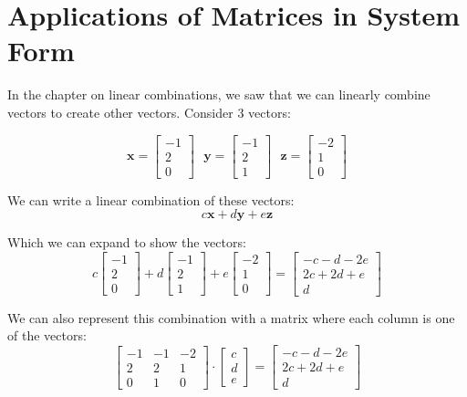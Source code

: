\chapter{Applications of Matrices in System Form}

In the chapter on linear combinations, we saw that we can linearly combine vectors to create other vectors. Consider 3 vectors:

$$\textbf{x} = \begin{bmatrix}
-1\\
2\\
0
\end{bmatrix}\text{ 	} \textbf{y} = \begin{bmatrix}
-1\\
2\\
1
\end{bmatrix}\text{ 	} \textbf{z} = \begin{bmatrix}
-2\\
1\\
0
\end{bmatrix}$$

We can write a linear combination of these vectors:
$$c\textbf{x} + d\textbf{y} + e\textbf{z}$$

Which we can expand to show the vectors:
$$c \begin{bmatrix}
-1\\
2\\
0
\end{bmatrix} + d \begin{bmatrix}
-1\\
2\\
1
\end{bmatrix} + e \begin{bmatrix}
-2\\
1\\
0
\end{bmatrix} = \begin{bmatrix}
-c - d - 2e\\
2c + 2d + e\\
d
\end{bmatrix}$$

We can also represent this combination with a matrix where each column is one of the vectors:
$$\begin{bmatrix}
-1 & -1 & -2\\
2 & 2 & 1\\
0 & 1 & 0
\end{bmatrix} \cdot \begin{bmatrix}
c\\
d\\
e
\end{bmatrix} = \begin{bmatrix}
-c - d - 2e\\
2c + 2d + e\\
d
\end{bmatrix}$$


